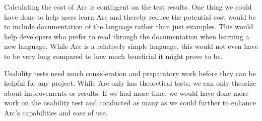 Calculating the cost of Arc is contingent on the test results. One thing we could have done to help users learn Arc and thereby reduce the potential cost would be to include documentation of the language rather than just examples. This would help developers who prefer to read through the documentation when learning a new language. While Arc is a relatively simple language, this would not even have to be very long compared to how much beneficial it might prove to be.

Usability tests need much consideration and preparatory work before they can be helpful for any project. While Arc only has theoretical tests, we can only theorize about improvements or results. If we had more time, we would have done more work on the usability test and conducted as many as we could further to enhance Arc's capabilities and ease of use.